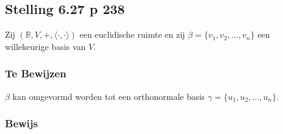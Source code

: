 \documentclass[lineaire_algebra_oplossingen.tex]{subfiles}
\begin{document}
\subsection{Stelling 6.27 p 238}
\label{6.27}
Zij $(\mathbb{R}, V,+, \langle \cdot,\cdot \rangle)$ een euclidische ruimte en zij $\beta = \{v_1,v_2,...,v_n\}$ een willekeurige basis van $V$.

\subsubsection*{Te Bewijzen}
$\beta$ kan omgevormd worden tot een orthonormale basis $\gamma = \{u_1,u_2,...,u_n\}$.

\subsubsection*{Bewijs}
\end{document}
